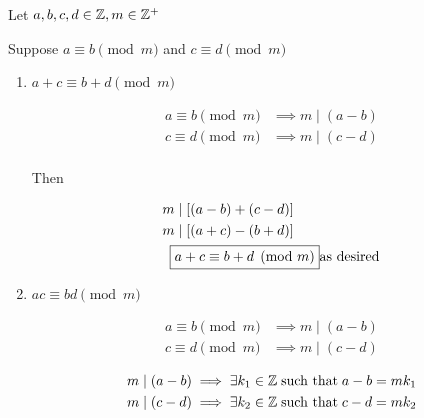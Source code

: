 \documentclass[../../Main.tex]{subfiles}
\begin{document}
\begin{proposition}
    Let $a, b, c, d \in \mathbb{Z}, m \in \mathbb{Z}^+$

    Suppose $a \equiv b \pmod{m}$ and $c \equiv d \pmod{m}$

    \begin{enumerate}
        \item
        {
            $a + c \equiv b + d \pmod{m}$

            \begin{poof}
                \begin{align*}
                    a \equiv b \pmod{m} &\implies m \mid (a - b) \\
                    c \equiv d \pmod{m} &\implies m \mid (c - d) \\
                \end{align*}

                Then

                \begin{align*}
                    m &\mid \left[(a-b) + (c-d)\right] \\
                    m &\mid \left[(a + c) - (b + d)\right] \\
                    \Aboxed{& a + c \equiv b + d \pmod{m}} \text{as desired} \\
                \end{align*}
            
            \end{poof}
        }

        \item
        {
            $ac \equiv bd \pmod{m}$

            \begin{poof}
                \begin{align*}
                    a \equiv b \pmod{m} &\implies m \mid (a - b) \\
                    c \equiv d \pmod{m} &\implies m \mid (c - d) \\
                \end{align*}
                \begin{align*}
                    m \mid (a-b) &\implies \exists k_1 \in \mathbb{Z} \; \text{such that} \; a - b = mk_1 \\
                    m \mid (c-d) &\implies \exists k_2 \in \mathbb{Z} \; \text{such that} \; c - d = mk_2 \\
                \end{align*}


\end{poof}}
\end{enumerate}
\end{proposition}
\end{document}
